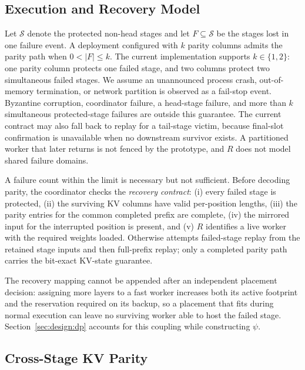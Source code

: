 \subsection{Execution and Recovery Model}\label{sec:design:model}

Let $\mathcal{S}$ denote the protected non-head stages and let $F\subseteq
\mathcal{S}$ be the stages lost in one failure event.  A deployment configured
with $k$ parity columns admits the parity path when $0<|F|\leq k$.  The current
implementation supports $k\in\{1,2\}$: one parity column protects one failed
stage, and two columns protect two simultaneous failed stages.  We assume an
unannounced process crash, out-of-memory termination, or network partition is
observed as a fail-stop event.  Byzantine corruption, coordinator failure, a
head-stage failure, and more than $k$ simultaneous protected-stage failures
are outside this guarantee.  The current contract may also fall back to
replay for a tail-stage victim, because final-slot confirmation is
unavailable when no downstream survivor exists.  A partitioned worker that later returns is
not fenced by the prototype, and $R$ does not model shared failure domains.

A failure count within the limit is necessary but not sufficient.  Before
decoding parity, the coordinator checks the \emph{recovery contract}: (i)
every failed stage is protected, (ii) the surviving KV columns have valid
per-position lengths, (iii) the parity entries for the common completed
prefix are complete, (iv) the mirrored input for the interrupted position is
present, and (v) $R$ identifies a live worker with the required weights
loaded.  Otherwise \sys{} attempts failed-stage replay from the retained
stage inputs and then full-prefix replay; only a completed parity path
carries the bit-exact KV-state guarantee.

The recovery mapping cannot be appended after an independent placement
decision: assigning more layers to a fast worker increases both its active
footprint and the reservation required on its backup, so a placement that
fits during normal execution can leave no surviving worker able to host the
failed stage.  Section~\ref{sec:design:dp} accounts for this coupling while
constructing $\psi$.

\subsection{Cross-Stage KV Parity}\label{sec:design:parity}


